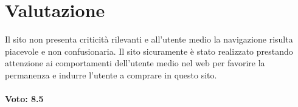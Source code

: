 \documentclass[12pt]{article}
\begin{document}
	\section{Valutazione}
	\vspace{0.5cm}
	Il sito non presenta criticità rilevanti e all'utente medio la navigazione risulta piacevole e non confusionaria. Il sito sicuramente è stato realizzato prestando attenzione ai comportamenti dell'utente medio nel web per favorire la permanenza e indurre l'utente a comprare in questo sito. 
	\\
	\\
	\textbf{Voto: 8.5}
	
\end{document}

